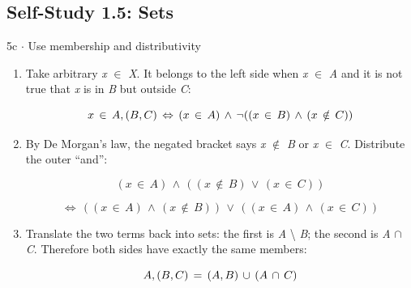 \documentclass[11pt]{article}
\begin{document}
\begin{keepsection}\subsection{Self-Study 1.5: Sets}

\begin{workedbox}{5c \ensuremath{\cdot} Use membership and distributivity}
\begin{enumerate}
\item {}
Take arbitrary \textit{x} \ensuremath{\in} \textit{X}. It belongs to the left side when \textit{x} \ensuremath{\in} \textit{A} and it is not true that \textit{x} is in \textit{B} but outside \textit{C}:

\begin{equation*}{x}\, \in \, {A}\, \\, ({B}\, \\, {C})\, \Leftrightarrow \, ({x}\, \in \, {A})\, \land \, \neg (({x}\, \in \, {B})\, \land \, ({x}\, \notin \, {C}))\end{equation*}
\item {}
By De Morgan’s law, the negated bracket says \textit{x} \ensuremath{\notin} \textit{B} or \textit{x} \ensuremath{\in} \textit{C}. Distribute the outer “and”:

\begin{equation*}({x}\, \in \, {A})\, \land \, (({x}\, \notin \, {B})\, \lor \, ({x}\, \in \, {C}))\end{equation*}

\begin{equation*}\Leftrightarrow \, (({x}\, \in \, {A})\, \land \, ({x}\, \notin \, {B}))\, \lor \, (({x}\, \in \, {A})\, \land \, ({x}\, \in \, {C}))\end{equation*}
\item {}
Translate the two terms back into sets: the first is \textit{A} \textbackslash{} \textit{B}; the second is \textit{A} \ensuremath{\cap} \textit{C}. Therefore both sides have exactly the same members:

\begin{equation*}{A}\, \\, ({B}\, \\, {C})\, =\, ({A}\, \\, {B})\, \cup \, ({A}\, \cap \, {C})\end{equation*}
\end{enumerate}
\end{workedbox}

\end{keepsection}
\end{document}
